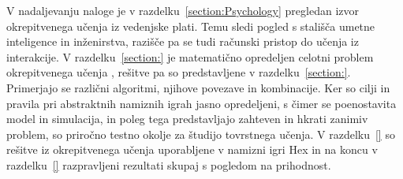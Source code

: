 \documentclass[a4paper, oneside, 12pt]{report}
\begin{document}
V nadaljevanju naloge je v razdelku~\ref{section:Psychology} pregledan izvor okrepitvenega učenja iz vedenjske plati. Temu sledi pogled s stališča umetne inteligence in inženirstva, razišče pa se tudi računski pristop do učenja iz interakcije. V razdelku~\ref{section:} je matematično opredeljen celotni problem okrepitvenega učenja , rešitve pa so predstavljene v razdelku~\ref{section:}. Primerjajo se različni algoritmi, njihove povezave in kombinacije. Ker so cilji in pravila pri abstraktnih namiznih igrah jasno opredeljeni, s čimer se poenostavita model in simulacija, in poleg tega predstavljajo zahteven in hkrati zanimiv problem, so priročno testno okolje za študijo tovrstnega učenja. 
V razdelku~\ref{} so rešitve iz okrepitvenega učenja uporabljene v namizni igri Hex in na koncu v razdelku~\ref{} razpravljeni rezultati skupaj s pogledom na prihodnost.
\end{document}
